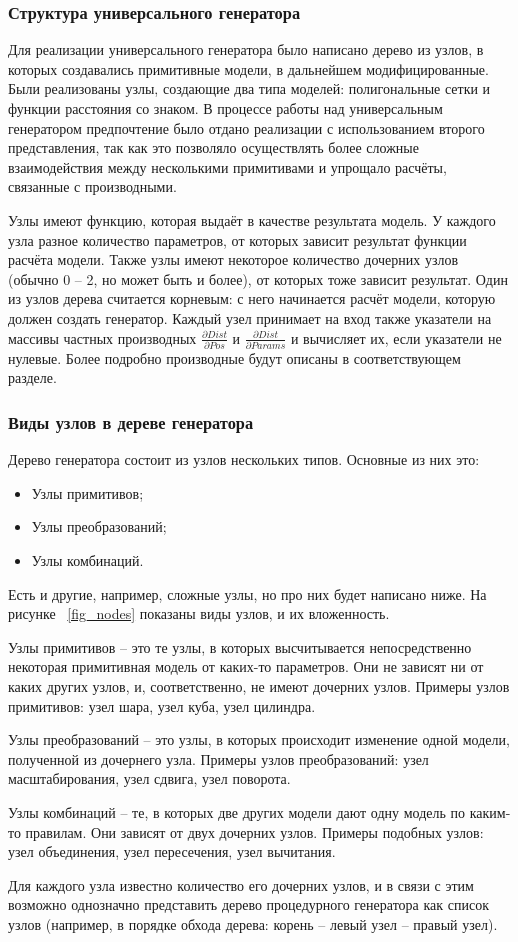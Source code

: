 \documentclass[a4paper,hidelinks,12pt]{article}
\begin{document}
\subsubsection{Структура универсального генератора}
Для реализации универсального генератора было написано дерево из узлов, в которых создавались примитивные модели, в дальнейшем модифицированные. Были реализованы узлы, создающие два типа моделей: полигональные сетки и функции расстояния со знаком. В процессе работы над универсальным генератором предпочтение было отдано реализации с использованием второго представления, так как это позволяло осуществлять более сложные взаимодействия между несколькими примитивами и упрощало расчёты, связанные с производными.
\par
Узлы имеют функцию, которая выдаёт в качестве результата модель. У каждого узла разное количество параметров, от которых зависит результат функции расчёта модели. Также узлы имеют некоторое количество дочерних узлов (обычно 0 – 2, но может быть и более), от которых тоже зависит результат. Один из узлов дерева считается корневым: с него начинается расчёт модели, которую должен создать генератор. Каждый узел принимает на вход также указатели на массивы частных производных $\frac{\partial Dist} {\partial Pos}$ и $\frac{\partial Dist} {\partial Params}$ и вычисляет их, если указатели не нулевые. Более подробно производные будут описаны в соответствующем разделе.
\subsubsection{Виды узлов в дереве генератора}
Дерево генератора состоит из узлов нескольких типов. Основные из них это:
\begin{itemize}
    \item Узлы примитивов;
    \item Узлы преобразований;
    \item Узлы комбинаций.
\end{itemize}
Есть и другие, например, сложные узлы, но про них будет написано ниже. На рисунке ~\ref{fig_nodes} показаны виды узлов, и их вложенность.
\par
Узлы примитивов – это те узлы, в которых высчитывается непосредственно некоторая примитивная модель от каких-то параметров. Они не зависят ни от каких других узлов, и, соответственно, не имеют дочерних узлов. Примеры узлов примитивов: узел шара, узел куба, узел цилиндра.
\par
Узлы преобразований – это узлы, в которых происходит изменение одной модели, полученной из дочернего узла. Примеры узлов преобразований: узел масштабирования, узел сдвига, узел поворота.
\par
Узлы комбинаций – те, в которых две других модели дают одну модель по каким-то правилам. Они зависят от двух дочерних узлов. Примеры подобных узлов: узел объединения, узел пересечения, узел вычитания.
\par
Для каждого узла известно количество его дочерних узлов, и в связи с этим возможно однозначно представить дерево процедурного генератора как список узлов (например, в порядке обхода дерева: корень – левый узел – правый узел).
\end{document}
